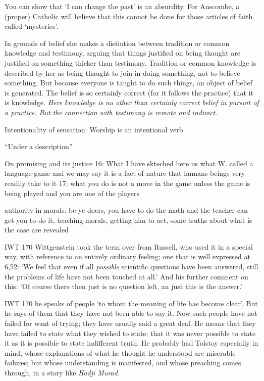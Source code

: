 You can show that `I can change the past' is an absurdity.
For Anscombe, a (proper) Catholic will believe that this cannot be done for those articles of faith called `mysteries'.

In grounds of belief she makes a distintion between tradition or common knowledge and testimony, arguing that things justified on being thaught are justified on something thicker than testimony. Tradition or common knowledge is described by her as being thaught to join in doing something, not to believe something. But because everyone is taught to do such things, an object of belief is generated. The belief is so certainly correct (for it follows the practice) that it is knowledge. \emph{Here knowledge is no other than certainly correct belief in pursuit of a practice. But the connection with testimony is remote and
indirect.}

Intentionality of sensation: Worship is an intentional verb

``Under a description''

On promising and its justice 16: What I have skteched here us what W. called a language-game and we may say it is a fact of nature that humans beings very readily take to it
17: what you do is not a move in the game unless the game is being played and you are one of the players

authority in morals: be ye doers, you have to do the math and the teacher can get you to do it, teaching morals, getting him to act, some truths about what is the case are revealed

IWT 170 Wittgenstein took the term over from Russell, who used it in a special way, with reference to an entirely ordinary feeling; one that is well expressed at 6,52: `We feel that even if all \emph{possible} scientific questions have been answered, still the problems of life have not been touched at all.' And his further comment on this: `Of course there then just is no question left, an just this is the answer.'

IWT 170 he speaks of people `to whom the meaning of life has become clear'. But he says of them that they have not been able to say it. Now such people have not failed for want of trying; they have usually said a great deal. He means that they have failed to state what they wished to state; that it was never possible to state it as it is possible to state indifferent truth. He probably had Tolstoy especially in mind, whose explanations of what he thought he understood are miserable failures; but whose understanding is manifested, and whose preaching comes through, in a story like \emph{Hadji Murad}.


